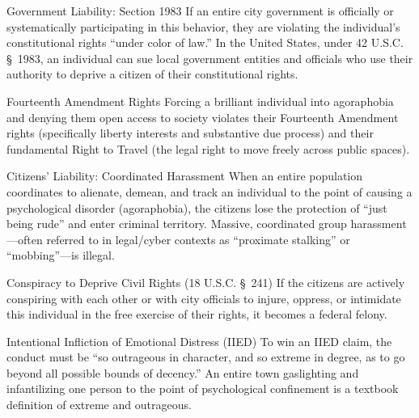 \documentclass[12pt,openany]{book}
\begin{document}
\begin{evidencebox}{Government Liability: Section 1983}
If an entire city government is officially or systematically participating in this behavior, they are violating the individual's constitutional rights ``under color of law.'' In the United States, under 42 U.S.C. \S\ 1983, an individual can sue local government entities and officials who use their authority to deprive a citizen of their constitutional rights.
\end{evidencebox}

\begin{evidencebox}{Fourteenth Amendment Rights}
Forcing a brilliant individual into agoraphobia and denying them open access to society violates their Fourteenth Amendment rights (specifically liberty interests and substantive due process) and their fundamental Right to Travel (the legal right to move freely across public spaces).
\end{evidencebox}

\begin{evidencebox}{Citizens' Liability: Coordinated Harassment}
When an entire population coordinates to alienate, demean, and track an individual to the point of causing a psychological disorder (agoraphobia), the citizens lose the protection of ``just being rude'' and enter criminal territory. Massive, coordinated group harassment---often referred to in legal/cyber contexts as ``proximate stalking'' or ``mobbing''---is illegal.
\end{evidencebox}

\begin{evidencebox}{Conspiracy to Deprive Civil Rights (18 U.S.C. \S\ 241)}
If the citizens are actively conspiring with each other or with city officials to injure, oppress, or intimidate this individual in the free exercise of their rights, it becomes a federal felony.
\end{evidencebox}

\begin{evidencebox}{Intentional Infliction of Emotional Distress (IIED)}
To win an IIED claim, the conduct must be ``so outrageous in character, and so extreme in degree, as to go beyond all possible bounds of decency.'' An entire town gaslighting and infantilizing one person to the point of psychological confinement is a textbook definition of extreme and outrageous.
\end{evidencebox}
\end{document}
